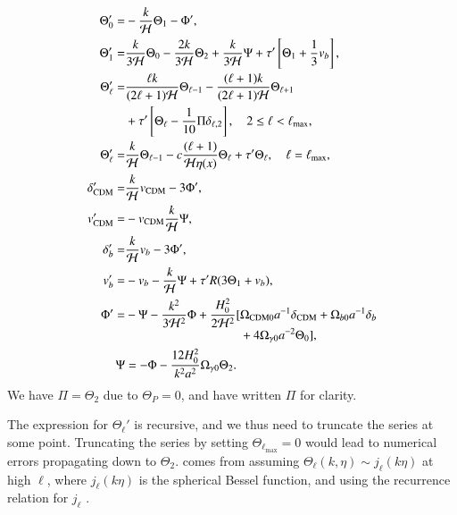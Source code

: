 \begin{subequations} \label{eq:M3:theory:perturbation_ODEs}
    \begin{align}
        \Theta_0' =& - \frac{k}{\mathcal{H}}\Theta_1 - \Phi', \label{eq:M3:theory:perturbation_ODEs_Theta0}\\
        \Theta_1' =& \frac{k}{3\mathcal{H}}\Theta_0 - \frac{2k}{3\mathcal{H}}\Theta_2 + \frac{k}{3\mathcal{H}}\Psi + \tau' \left[ \Theta_1 + \frac{1}{3}v_b \right], \label{eq:M3:theory:perturbation_ODEs_Theta1} \\ 
        \Theta_\ell' =& \frac{\ell k}{(2\ell+1)\mathcal{H}}\Theta_{\ell-1} - \frac{(\ell+1)k}{(2\ell+1)\mathcal{H}}\Theta_{\ell+1} \nonumber \\
        & + \tau'\left[ \Theta_\ell - \frac{1}{10}\Pi \delta_{\ell,2} \right],\quad 2\leq\ell<\ell_\mathrm{max}, \label{eq:M3:theory:perturbation_ODEs_Theta_ell} \\
        \Theta_\ell' =& \frac{k}{\mathcal{H}}\Theta_{\ell-1} - c \frac{(\ell+1)}{\mathcal{H}\eta(x)}\Theta_{\ell} + \tau' \Theta_\ell,\quad \ell=\ell_\mathrm{max}, \label{eq:M3:theory:perturbation_ODEs_Theta_ell_max} \\
        \delta_\mathrm{CDM}' =& \frac{k}{\mathcal{H}} v_\mathrm{CDM} - 3\Phi', \label{eq:M3:theory:perturbation_ODEs_delta_cdm} \\
        v_\mathrm{CDM}' =& - v_\mathrm{CDM} \frac{k}{\mathcal{H}} \Psi, \label{eq:M3:theory:perturbation_ODEs_v_cdm} \\
        \delta_b' =& \frac{k}{\mathcal{H}} v_b - 3\Phi', \label{eq:M3:theory:perturbation_ODEs_delta_b} \\
        v_b' =& -v_b - \frac{k}{\mathcal{H}} \Psi + \tau' R(3\Theta_1 + v_b), \label{eq:M3:theory:perturbation_ODEs_v_b} \\
        \Phi' =& -\Psi - \frac{k^2}{3\mathcal{H}^2}\Phi + \frac{H_0^2}{2\mathcal{H}^2} \begin{aligned}[t]
            [&\Omega_\mathrm{CDM0} a^{-1}\delta_\mathrm{CDM} + \Omega_{b0} a^{-1} \delta_b \\
            &+4\Omega_{\gamma 0} a^{-2} \Theta_0], 
            \end{aligned} \label{eq:M3:theory:perturbation_ODEs_Phi} \\
        \Psi &= -\Phi - \frac{12H_0^2}{k^2 a^2} \Omega_{\gamma 0} \Theta_2. \label{eq:M3:theory:perturbation_ODEs_Psi}
    \end{align}
\end{subequations}
We have $\Pi=\Theta_2$ due to $\Theta_P=0$, and have written $\Pi$ for clarity. 

The expression for $\Theta_\ell'$ is recursive, and we thus need to truncate the series at some point. Truncating the series by setting $\Theta_{\ell_\mathrm{max}}=0$ would lead to numerical errors propagating down to $\Theta_2$.  comes from assuming $\Theta_\ell(k,\eta)\sim j_\ell(k\eta)$ at high $\ell$, where $j_\ell(k\eta)$ is the spherical Bessel function, and using the recurrence relation for $j_\ell$ \citep[see][Eq. (46)-(49)]{callin}. 

